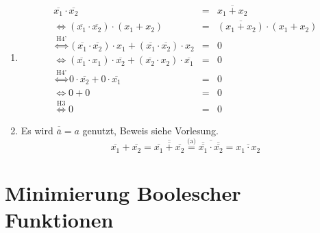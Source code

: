 \documentclass[DIN, pagenumber=false, fontsize=11pt, parskip=half]{scrartcl}
\begin{document}
    \subsection{}
    \begin{enumerate}[label=(\alph*)]
        \item 
            \begin{eqnarray*}
                \overline{x_1} \cdot \overline{x_2} &=& \overline{x_1 + x_2}\\
                \Leftrightarrow (\overline{x_1} \cdot \overline{x_2}) \cdot (x_1 + x_2) &=& \overline{(x_1 + x_2)} \cdot  (x_1 + x_2)\\
                \stackrel{\text{H4'}}{\Leftrightarrow} (\overline{x_1} \cdot \overline{x_2}) \cdot x_1 +  (\overline{x_1} \cdot \overline{x_2}) \cdot x_2 &=& 0\\
                \Leftrightarrow (\overline{x_1} \cdot x_1) \cdot \overline{x_2} + (\overline{x_2} \cdot x_2)  \cdot \overline{x_1} &=& 0\\
                \stackrel{\text{H4'}}{\Leftrightarrow} 0 \cdot \overline{x_2} + 0 \cdot \overline{x_1} &=& 0\\
                \Leftrightarrow 0 + 0 &=& 0\\
                \stackrel{\text{H3}}{\Leftrightarrow} 0 &=& 0
            \end{eqnarray*}
        \item
            Es wird $\overline{\overline{a}} = a$ genutzt, Beweis siehe Vorlesung.
            \begin{equation*}
                \overline{x_1} + \overline{x_2} = \overline{\overline{\overline{x_1} + \overline{x_2}}} \stackrel{\text{(a)}}{=}
                \overline{\overline{\overline{x_1}} \cdot \overline{\overline{x_2}}} = \overline{x_1 \cdot x_2}
            \end{equation*}
    \end{enumerate}

    \section{Minimierung Boolescher Funktionen}
    \setcounter{subsection}{2}
\end{document}
